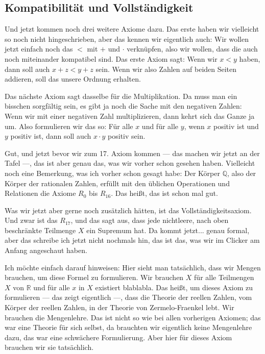 \subsection{Kompatibilität und Vollständigkeit}
\begin{spoken-clean}[00:18:20 - 00:20:49]
Und jetzt kommen noch drei weitere Axiome dazu. Das erste haben wir vielleicht so noch nicht hingeschrieben, aber das kennen wir eigentlich auch: Wir wollen jetzt einfach noch das $<$ mit $+$ und $\cdot$ verknüpfen, also wir wollen, dass die auch noch miteinander kompatibel sind. Das erste Axiom sagt: Wenn wir $x < y$ haben, dann soll auch $x + z < y + z$ sein. Wenn wir also Zahlen auf beiden Seiten addieren, soll das unsere Ordnung erhalten.

Das nächste Axiom sagt dasselbe für die Multiplikation. Da muss man ein bisschen sorgfältig sein, es gibt ja noch die Sache mit den negativen Zahlen: Wenn wir mit einer negativen Zahl multiplizieren, dann kehrt sich das Ganze ja um. Also formulieren wir das so: Für alle $x$ und für alle $y$, wenn $x$ positiv ist und $y$ positiv ist, dann soll auch $x \cdot y$ positiv sein.

Gut, und jetzt bevor wir zum 17. Axiom kommen --- das machen wir jetzt an der Tafel ---, das ist aber genau das, was wir vorher schon gesehen haben. Vielleicht noch eine Bemerkung, was ich vorher schon gesagt habe: Der Körper $\mathbb{Q}$, also der Körper der rationalen Zahlen, erfüllt mit den üblichen Operationen und Relationen die Axiome $R_0$ bis $R_{16}$. Das heißt, das ist schon mal gut.

Was wir jetzt aber gerne noch zusätzlich hätten, ist das Vollständigkeitsaxiom. Und zwar ist das $R_{17}$, und das sagt aus, dass jede nichtleere, nach oben beschränkte Teilmenge $X$ ein Supremum hat. Da kommt jetzt... genau formal, aber das schreibe ich jetzt nicht nochmals hin, das ist das, was wir im Clicker am Anfang angeschaut haben.

Ich möchte einfach darauf hinweisen: Hier sieht man tatsächlich, dass wir Mengen brauchen, um diese Formel zu formulieren. Wir brauchen $X$ für alle Teilmengen $X$ von $\mathbb{R}$ und für alle $x$ in $X$ existiert blablabla. Das heißt, um dieses Axiom zu formulieren --- das zeigt eigentlich ---, dass die Theorie der reellen Zahlen, vom Körper der reellen Zahlen, in der Theorie von Zermelo-Fraenkel lebt. Wir brauchen die Mengenlehre. Das ist nicht so wie bei allen vorherigen Axiomen; das war eine Theorie für sich selbst, da brauchten wir eigentlich keine Mengenlehre dazu, das war eine schwächere Formulierung. Aber hier für dieses Axiom brauchen wir sie tatsächlich.
\end{spoken-clean}

